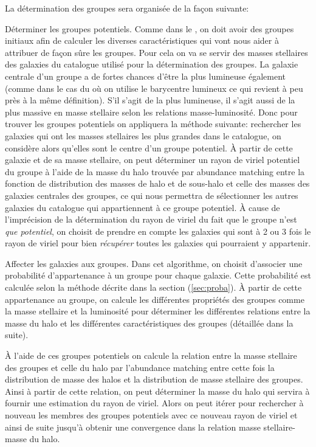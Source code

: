 
La détermination des groupes sera organisée de la façon suivante:

\noindent{} Déterminer les groupes potentiels. Comme dans le \citet{Yang+07}, on doit avoir des groupes initiaux afin de
calculer les diverses caractéristiques qui vont nous aider à attribuer de façon sûre les groupes. Pour cela on va se servir des
masses stellaires des galaxies du catalogue utilisé pour la détermination des groupes. La galaxie centrale d'un groupe a de fortes
chances d'être la plus lumineuse également (comme dans le cas du \citet{Yang+07} où on utilise le barycentre lumineux ce qui
revient à peu près à la même définition). S'il s'agit de la plus lumineuse, il s'agit aussi de la plus massive en masse stellaire
selon les relations masse-luminosité. Donc pour trouver les groupes potentiels on appliquera la méthode suivante: rechercher les
galaxies qui ont les masses stellaires les plus grandes dans le catalogue, on considère alors qu'elles sont le centre d'un groupe
potentiel. \`A partir de cette galaxie et de sa masse stellaire, on peut déterminer un rayon de viriel potentiel du groupe à l'aide
de la masse du halo trouvée par abundance matching entre la fonction de distribution des masses de halo et de sous-halo et celle
des masses des galaxies centrales des groupes, ce qui nous permettra de sélectionner les autres galaxies du catalogue qui
appartiennent à ce groupe potentiel. \`A cause de l'imprécision de la détermination du rayon de viriel du fait que le groupe n'est
\emph{que potentiel}, on choisit de prendre en compte les galaxies qui sont à 2 ou 3 fois le rayon de viriel pour bien
\emph{récupérer} toutes les galaxies qui pourraient y appartenir.

\noindent{} Affecter les galaxies aux groupes. Dans cet algorithme, on choisit d'associer une probabilité d'appartenance à
un groupe pour chaque galaxie. Cette probabilité est calculée selon la méthode décrite dans la section (\ref{sec:proba}). \`A
partir de cette appartenance au groupe, on calcule les différentes propriétés des groupes comme la masse stellaire et la luminosité
pour déterminer les différentes relations entre la masse du halo et les différentes caractéristiques des groupes (détaillée dans la
suite).

\noindent{} \`A l'aide de ces groupes potentiels on calcule la relation entre la masse stellaire des groupes et celle du
halo par l'abundance matching entre cette fois la distribution de masse des halos et la distribution de masse stellaire des
groupes. Ainsi à partir de cette relation, on peut déterminer la masse du halo qui servira à fournir une estimation du rayon de
viriel. Alors on peut itérer pour rechercher à nouveau les membres des groupes potentiels avec ce nouveau rayon de viriel et ainsi
de suite jusqu'à obtenir une convergence dans la relation masse stellaire-masse du halo.

